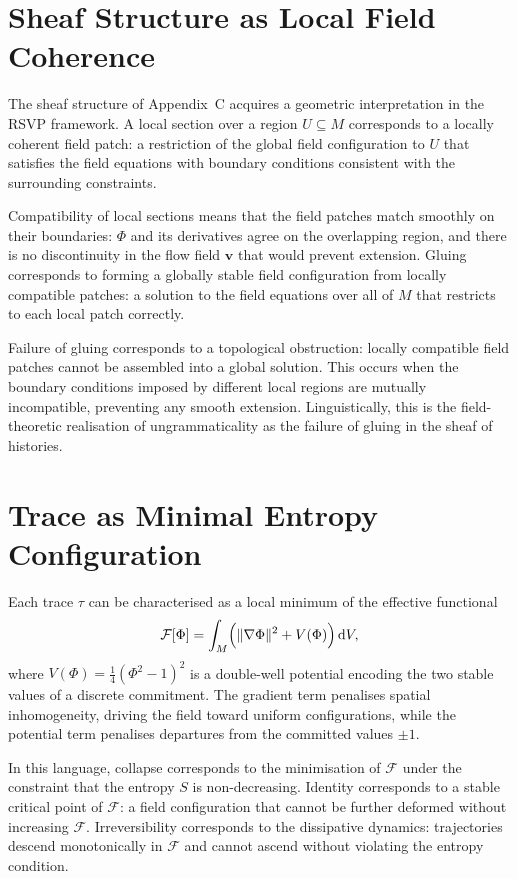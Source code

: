 \documentclass[12pt, oneside]{amsbook}
\theoremstyle{plain}
\theoremstyle{definition}
\theoremstyle{remark}
\newcommand{\RSVPfield}{\Phi}
\newcommand{\RSVPvec}{\mathbf{v}}
\begin{document}
\section{Sheaf Structure as Local Field Coherence}

The sheaf structure of Appendix~C acquires a geometric interpretation in the
RSVP framework. A local section over a region $U \subseteq M$ corresponds
to a locally coherent field patch: a restriction of the global field
configuration to $U$ that satisfies the field equations with boundary
conditions consistent with the surrounding constraints.

Compatibility of local sections means that the field patches match smoothly
on their boundaries: $\RSVPfield$ and its derivatives agree on the overlapping
region, and there is no discontinuity in the flow field $\RSVPvec$ that would
prevent extension. Gluing corresponds to forming a globally stable field
configuration from locally compatible patches: a solution to the field
equations over all of $M$ that restricts to each local patch correctly.

Failure of gluing corresponds to a topological obstruction: locally compatible
field patches cannot be assembled into a global solution. This occurs when
the boundary conditions imposed by different local regions are mutually
incompatible, preventing any smooth extension. Linguistically, this is the
field-theoretic realisation of ungrammaticality as the failure of gluing in
the sheaf of histories.

\section{Trace as Minimal Entropy Configuration}

Each trace $\tau$ can be characterised as a local minimum of the effective
functional
\[
  \mathcal{F}[\RSVPfield]
  = \int_M \Bigl( \|\nabla \RSVPfield\|^2 + V(\RSVPfield) \Bigr)\, \mathrm{d}V,
\]
where $V(\RSVPfield) = \frac{1}{4}(\RSVPfield^2 - 1)^2$ is a double-well
potential encoding the two stable values of a discrete commitment. The
gradient term penalises spatial inhomogeneity, driving the field toward
uniform configurations, while the potential term penalises departures from
the committed values $\pm 1$.

In this language, collapse corresponds to the minimisation of $\mathcal{F}$
under the constraint that the entropy $S$ is non-decreasing. Identity
corresponds to a stable critical point of $\mathcal{F}$: a field configuration
that cannot be further deformed without increasing $\mathcal{F}$. Irreversibility
corresponds to the dissipative dynamics: trajectories descend monotonically
in $\mathcal{F}$ and cannot ascend without violating the entropy condition.
\end{document}

